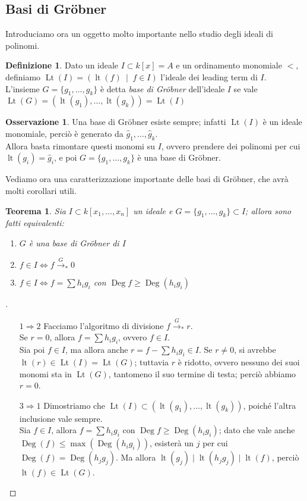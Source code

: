 \documentclass[a4paper,10pt]{article}
\theoremstyle{plain}
\newtheorem{thm}{Teorema}[section]
\theoremstyle{definition}
\newtheorem{defn}{Definizione}[section]
\newtheorem*{oss}{Osservazione}
\newenvironment{myproof}[1][\proofname]{%
  \begin{proof}[#1]$ $\par\nobreak\ignorespaces
}{%
  \qedhere
  \end{proof}
}
\DeclareMathOperator{\lt}{lt}
\DeclareMathOperator{\Lt}{Lt}
\DeclareMathOperator{\Deg}{Deg}
\DeclareMathOperator{\st}{\; |\;}
\begin{document}
\subsection{Basi di Gr\"obner}
Introduciamo ora un oggetto molto importante nello studio degli ideali di polinomi.
\begin{defn}
    Dato un ideale $I\subset k[x]=A$ e un ordinamento monomiale $<$, definiamo $\Lt(I)=(\lt(f)\st f\in I)$ l'ideale dei leading term di $I$.\\
    L'insieme $G=\{ g_1,\dots,g_k \}$ è detta \emph{base di Gr\"obner} dell'ideale $I$ se vale $\Lt(G)=(\lt(g_1),\dots,\lt(g_k))=\Lt(I)$
\end{defn}
\begin{oss}
    Una base di Gr\"obner esiste sempre; infatti $\Lt(I)$ è un ideale monomiale, perciò è generato da $\hat g_1,\dots,\hat g_k$.\\
    Allora basta rimontare questi monomi su $I$, ovvero prendere dei polinomi per cui $\lt(g_i)=\hat g_i$, e poi $G=\{ g_1,\dots,g_k \}$ è una base di Gr\"obner.
\end{oss}
Vediamo ora una caratterizzazione importante delle basi di Gr\"obner, che avrà molti corollari utili.

\begin{thm}
    Sia $I\subset k[x_1,\dots,x_n]$ un ideale e $G=\{g_1,\dots,g_k\}\subset I$; allora sono fatti equivalenti:
    \begin{enumerate}
        \item $G$ è una base di Gr\"obner di $I$
        \item $f\in I\iff f\xrightarrow{G}_\ast 0$
        \item $f\in I\iff f=\sum h_ig_i$ con $\Deg f\ge \Deg(h_ig_i)$
    \end{enumerate}
\end{thm}
\begin{myproof}
    \begin{itemize}
        \item[$1\Rightarrow2$] Facciamo l'algoritmo di divisione $f\xrightarrow{G}_\ast r$.\\
        Se $r=0$, allora $f=\sum h_ig_i$, ovvero $f\in I$.\\
        Sia poi $f\in I$, ma allora anche $r=f-\sum h_ig_i\in I$. Se $r\neq0$, si avrebbe $\lt(r)\in\Lt(I)=\Lt(G)$; tuttavia $r$ è ridotto, ovvero nessuno dei suoi monomi sta in $\Lt(G)$, tantomeno il suo termine di testa; perciò abbiamo $r=0$.
        \item[$3\Rightarrow1$] Dimostriamo che $\Lt(I)\subset (\lt(g_1),\dots,\lt(g_k))$, poiché l'altra inclusione vale sempre.\\
        Sia $f\in I$, allora $f=\sum h_ig_i$ con $\Deg f\ge \Deg(h_ig_i)$; dato che vale anche $\Deg(f)\le\max(\Deg(h_ig_i))$, esisterà un $j$ per cui $\Deg(f)=\Deg(h_jg_j)$. Ma allora $\lt(g_j)\mid\lt(h_jg_j)\mid\lt(f)$, perciò $\lt(f)\in\Lt(G)$.\\
    \end{itemize}
\end{myproof}
\end{document}
